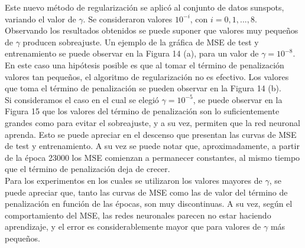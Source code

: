 \documentclass[12pt, a4paper]{article}
\begin{document}
Este nuevo método de regularización se aplicó al conjunto de datos sunspots, variando el valor de $\gamma$. Se consideraron valores $10^{-i}$, con $i = 0,1,...,8$.\\
Observando los resultados obtenidos se puede suponer que valores muy pequeños de $\gamma$ producen sobreajuste. Un ejemplo de la gráfica de MSE de test y entrenamiento se puede observar en la Figura 14 (a), para un valor de $\gamma = 10^{-8}$. En este caso una hipótesis posible es que al tomar el término de penalización valores tan pequeños, el algoritmo de regularización no es efectivo. Los valores que toma el término de penalización se pueden observar en la Figura 14 (b). \\
Si consideramos el caso en el cual se elegió $\gamma = 10^{-5}$, se puede observar en la Figura 15 que los valores del término de penalización son lo suficientemente grandes como para evitar el sobreajuste, y a su vez, permiten que la red neuronal aprenda. Esto se puede apreciar en el descenso que presentan las curvas de MSE de test y entrenamiento. A su vez se puede notar que, aproximadamente, a partir de la época 23000 los MSE comienzan a permanecer constantes, al mismo tiempo que el término de penalización deja de crecer.\\
Para los experimentos en los cuales se utilizaron los valores mayores de $\gamma$, se puede apreciar que, tanto las curvas de MSE como las de valor del término de penalización en función de las épocas, son muy discontinuas. A su vez, según el comportamiento del MSE, las redes neuronales parecen no estar haciendo aprendizaje, y el error es considerablemente mayor que para valores de $\gamma$ más pequeños.
\end{document}
